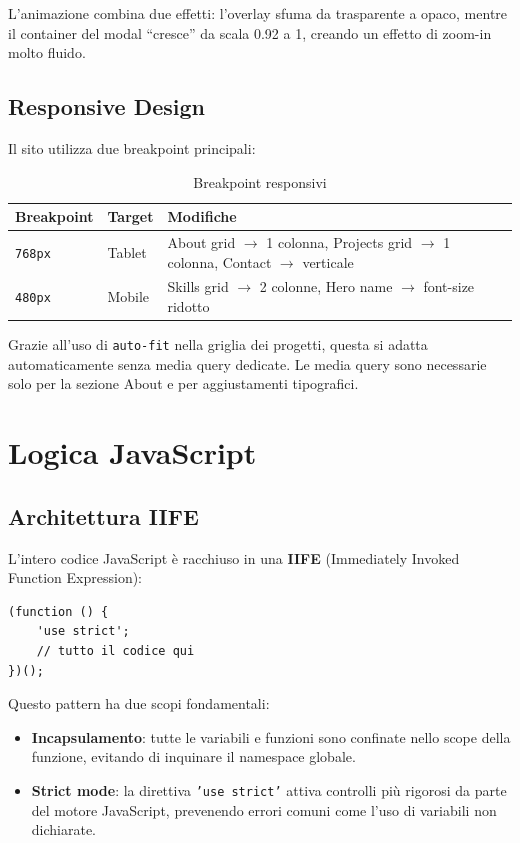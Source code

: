 \documentclass[a4paper,12pt]{report}
\begin{document}
L'animazione combina due effetti: l'overlay sfuma da trasparente a opaco, mentre il container del modal ``cresce'' da scala 0.92 a 1, creando un effetto di zoom-in molto fluido.

\section{Responsive Design}

Il sito utilizza due breakpoint principali:

\begin{table}[H]
\centering
\caption{Breakpoint responsivi}
\begin{tabularx}{\textwidth}{l l X}
\toprule
\textbf{Breakpoint} & \textbf{Target} & \textbf{Modifiche} \\
\midrule
\texttt{768px} & Tablet & About grid $\to$ 1 colonna, Projects grid $\to$ 1 colonna, Contact $\to$ verticale \\
\texttt{480px} & Mobile & Skills grid $\to$ 2 colonne, Hero name $\to$ font-size ridotto \\
\bottomrule
\end{tabularx}
\end{table}

Grazie all'uso di \texttt{auto-fit} nella griglia dei progetti, questa si adatta automaticamente senza media query dedicate. Le media query sono necessarie solo per la sezione About e per aggiustamenti tipografici.


\chapter{Logica JavaScript}

\section{Architettura IIFE}

L'intero codice JavaScript \`e racchiuso in una \textbf{IIFE} (Immediately Invoked Function Expression):

\begin{lstlisting}[style=jsstyle, caption={Pattern IIFE}]
(function () {
    'use strict';
    // tutto il codice qui
})();
\end{lstlisting}

Questo pattern ha due scopi fondamentali:
\begin{itemize}[leftmargin=2cm]
    \item \textbf{Incapsulamento}: tutte le variabili e funzioni sono confinate nello scope della funzione, evitando di inquinare il namespace globale.
    \item \textbf{Strict mode}: la direttiva \texttt{'use strict'} attiva controlli pi\`u rigorosi da parte del motore JavaScript, prevenendo errori comuni come l'uso di variabili non dichiarate.
\end{itemize}
\end{document}
